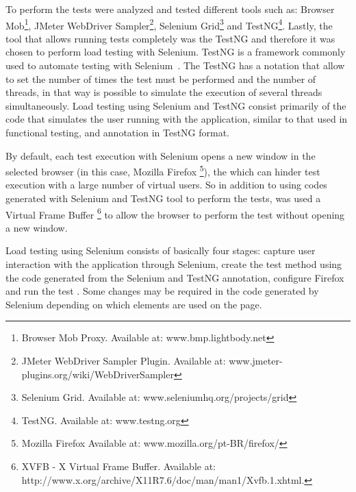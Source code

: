 \documentclass[runningheads,a4paper]{llncs}
\begin{document}
To perform the tests were analyzed and tested different tools such as: Browser Mob\footnote{Browser Mob Proxy. Available at: www.bmp.lightbody.net}, JMeter WebDriver Sampler\footnote{JMeter WebDriver Sampler Plugin. Available at: www.jmeter-plugins.org/wiki/WebDriverSampler}, Selenium Grid\footnote{Selenium Grid. Available at: www.seleniumhq.org/projects/grid} and TestNG\footnote{TestNG. Available at: www.testng.org}. Lastly, the tool that allows running tests completely was the TestNG and therefore it was chosen to perform load testing with Selenium. TestNG is a framework commonly used to automate testing with Selenium~\cite{bindal2014test}. The TestNG has a notation that allow to set the number of times the test must be performed and the number of threads, in that way is possible to simulate the execution of several threads simultaneously. Load testing using Selenium and TestNG consist primarily of the code that simulates the user running with the application, similar to that used in functional testing, and annotation in TestNG format.


By default, each test execution with Selenium opens a new window in the selected browser (in this case, Mozilla Firefox \footnote{Mozilla Firefox Available at: www.mozilla.org/pt-BR/firefox/}), the which can hinder test execution with a large number of virtual users. So in addition to using codes generated with Selenium and TestNG tool to perform the tests, was used a Virtual Frame Buffer \footnote{XVFB - X Virtual Frame Buffer. Available at: http://www.x.org/archive/X11R7.6/doc/man/man1/Xvfb.1.xhtml.} to allow the browser to perform the test without opening a new window.


Load testing using Selenium consists of basically four stages: capture user interaction with the application through Selenium, create the test method using the code generated from the Selenium and TestNG annotation, configure Firefox and run the test . Some changes may be required in the code generated by Selenium depending on which elements are used on the page.
\end{document}
